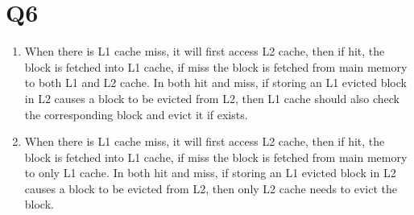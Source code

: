 \documentclass[12pt]{article}
\begin{document}
\section*{Q6}

	\begin{enumerate}
		\item
			When there is L1 cache miss, it will first access L2 cache, then if hit, the block is fetched into L1 cache, if miss the block is fetched from main memory to both L1 and L2 cache. In both hit and miss, if storing an L1 evicted block in L2 causes a block to be evicted from L2, then L1 cache should also check the corresponding block and evict it if exists.
		\item
			When there is L1 cache miss, it will first access L2 cache, then if hit, the block is fetched into L1 cache, if miss the block is fetched from main memory to only L1 cache. In both hit and miss, if storing an L1 evicted block in L2 causes a block to be evicted from L2, then only L2 cache needs to evict the block.
	\end{enumerate}
\end{document}
